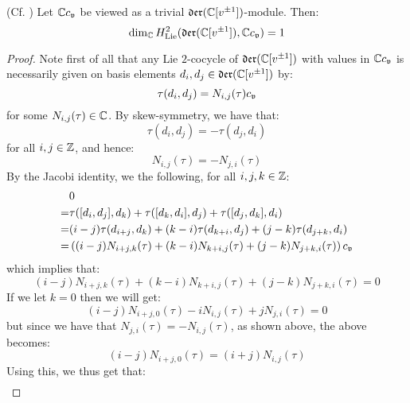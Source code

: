         
        \begin{lemma} \label{lemma: H^2_of_witt_algebra}
            (Cf. \cite[Proposition 1.3]{kac_raina_rozhkovskaya_bombay_lectures_on_highest_weight_modules_of_infinite_dimensional_lie_algebras}) Let $\bbC c_{\frakv}$ be viewed as a trivial $\der(\bbC[v^{\pm 1}])$-module. Then:
                $$\dim_{\bbC} H^2_{\Lie}( \der(\bbC[v^{\pm 1}]), \bbC c_{\frakv} ) = 1$$
        \end{lemma}
            \begin{proof}
                Note first of all that any Lie $2$-cocycle of $\der(\bbC[v^{\pm 1}])$ with values in $\bbC c_{\frakv}$ is necessarily given on basis elements $d_i, d_j \in \der(\bbC[v^{\pm 1}])$ by:
                    $$\tau(d_i, d_j) = N_{i, j}(\tau) c_{\frakv}$$
                for some $N_{i, j}(\tau) \in \bbC$. By skew-symmetry, we have that:
                    $$\tau(d_i, d_j) = -\tau(d_j, d_i)$$
                for all $i, j \in \Z$, and hence:
                    $$N_{i, j}(\tau) = -N_{j, i}(\tau)$$
                By the Jacobi identity, we the following, for all $i, j, k \in \Z$:
                    $$
                        \begin{aligned}
                            & 0
                            \\
                            = & \tau([d_i, d_j], d_k) + \tau([d_k, d_i], d_j) + \tau([d_j, d_k], d_i)
                            \\
                            = & (i - j) \tau(d_{i + j}, d_k) + (k - i) \tau(d_{k + i}, d_j) + (j - k) \tau(d_{j + k}, d_i)
                            \\
                            = & \left( (i - j) N_{i + j, k}(\tau) + (k - i) N_{k + i, j}(\tau) + (j - k) N_{j + k, i}(\tau) \right) c_{\frakv}
                        \end{aligned}
                    $$
                which implies that:
                    $$(i - j) N_{i + j, k}(\tau) + (k - i) N_{k + i, j}(\tau) + (j - k) N_{j + k, i}(\tau) = 0$$
                If we let $k = 0$ then we will get:
                    $$(i - j) N_{i + j, 0}(\tau) - i N_{i, j}(\tau) + j N_{j, i}(\tau) = 0$$
                but since we have that $N_{j, i}(\tau) = -N_{i, j}(\tau)$, as shown above, the above becomes:
                    $$(i - j) N_{i + j, 0}(\tau) = (i + j) N_{i, j}(\tau)$$
                Using this, we thus get that:
                    $$
                        \begin{aligned}

\end{aligned}$$
\end{proof}
